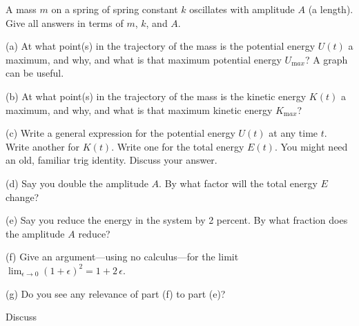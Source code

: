 \documentclass[12pt,letterpaper]{article}
\begin{document}
A mass $m$ on a spring of spring constant $k$ oscillates with
amplitude $A$ (a length).  Give all answers in terms of $m$, $k$, and
$A$.

(a) At what point(s) in the trajectory of the mass is the potential
energy $U(t)$ a maximum, and why, and what is that maximum potential
energy $U_{\mathrm max}$?  A graph can be useful.

\vfill

(b) At what point(s) in the trajectory of the mass is the kinetic
energy $K(t)$ a maximum, and why, and what is that maximum kinetic
energy $K_{\mathrm max}$?

\vfill

(c) Write a general expression for the potential energy $U(t)$ at any
time $t$.  Write another for $K(t)$.  Write one for the total energy
$E(t)$.  You might need an old, familiar trig identity.  Discuss your
answer.

\vfill

(d) Say you double the amplitude $A$.  By what factor will the total
energy $E$ change?

\vfill

(e) Say you reduce the energy in the system by 2 percent.  By what
fraction does the amplitude $A$ reduce?

\vfill

(f) Give an argument---using no calculus---for the limit
$\lim_{\epsilon\rightarrow 0} (1 + \epsilon)^2 = 1 + 2\,\epsilon$.

\vfill

(g) Do you see any relevance of part (f) to part (e)?

\vfill

Discuss
\end{document}
